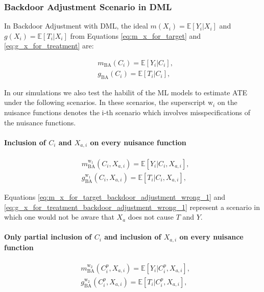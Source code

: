 \documentclass{article}
\numberwithin{equation}{section}
\begin{document}
\subsubsection{Backdoor Adjustment Scenario in DML}

In Backdoor Adjustment with DML, the ideal $m(X_i) = \mathbb{E}[Y_i | X_i]$ and $g(X_i) = \mathbb{E}[T_i | X_i]$ from Equations \eqref{eq:m_x_for_target} and \eqref{eq:g_x_for_treatment} are:

\begin{align}
    & m_{\text{BA}}(C_i) = \mathbb{E}[Y_i | C_i],
    \label{eq:m_x_for_target_backdoor_adjustment}
    \\
    & g_{\text{BA}}(C_i) = \mathbb{E}[T_i | C_i],
    \label{eq:g_x_for_treatment_backdoor_adjustment}
\end{align}

In our simulations we also test the habilit of the ML models to estimate ATE under the following scenarios. In these scenarios, the superscript $\text{w}_i$ on the nuisance functions denotes the i-th scenario which involves misspecifications of the nuisance functions.

\paragraph{Inclusion of $C_i$ and $X_{a, i}$ on every nuisance function}

\begin{align}
    & m_{\text{BA}}^{\text{w}_1}(C_i, X_{a, i}) = \mathbb{E}[Y_i | C_i, X_{a, i}],
    \label{eq:m_x_for_target_backdoor_adjustment_wrong_1}
    \\
    & g_{\text{BA}}^{\text{w}_1}(C_i, X_{a, i}) = \mathbb{E}[T_i | C_i, X_{a, i}],
    \label{eq:g_x_for_treatment_backdoor_adjustment_wrong_1}
\end{align}

Equations \eqref{eq:m_x_for_target_backdoor_adjustment_wrong_1} and \eqref{eq:g_x_for_treatment_backdoor_adjustment_wrong_1} represent a scenario in which one would not be aware that $X_a$ does not cause $T$ and $Y$.

\paragraph{Only partial inclusion of $C_i$ and inclusion of $X_{a, i}$ on every nuisance function}
\label{par:backdoor_adjustment_wrong_2}

\begin{align}
    & m_{\text{BA}}^{\text{w}_2}(C^{p}_i, X_{a, i}) = \mathbb{E}[Y_i | C^{p}_i, X_{a, i}],
    \label{eq:m_x_for_target_backdoor_adjustment_wrong_2}
    \\
    & g_{\text{BA}}^{\text{w}_2}(C^{p}_i, X_{a, i}) = \mathbb{E}[T_i | C^{p}_i, X_{a, i}],
    \label{eq:g_x_for_treatment_backdoor_adjustment_wrong_2}
\end{align}
\end{document}
